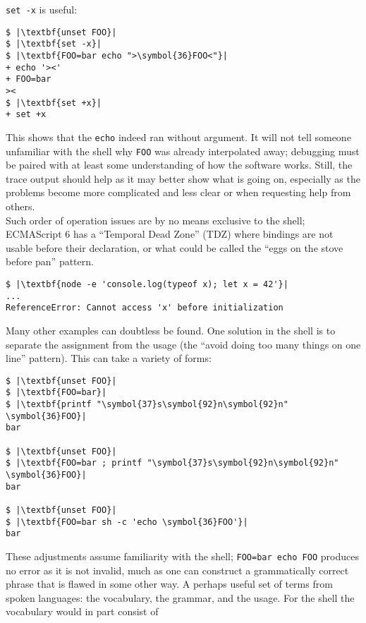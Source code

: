 \documentclass[10pt,a4paper]{article}
\begin{document}
\texttt{set -x} is useful:

\begin{lstlisting}
$ |\textbf{unset FOO}|
$ |\textbf{set -x}|
$ |\textbf{FOO=bar echo ">\symbol{36}FOO<"}|
+ echo '><'
+ FOO=bar
><
$ |\textbf{set +x}|
+ set +x
\end{lstlisting}

This shows that the \texttt{echo} indeed ran without argument. It will
not tell someone unfamiliar with the shell why \texttt{FOO}
was already interpolated away; debugging must be paired with at least
some understanding of how the software works. Still, the trace output
should help as it may better show what is going on, especially as the
problems become more complicated and less clear or when requesting help
from others. \\

Such order of operation issues are by no means exclusive to the shell;
ECMAScript 6 has a ``Temporal Dead Zone'' (TDZ) where bindings are not
usable before their declaration, or what could be called the ``eggs on
the stove before pan'' pattern.

\begin{lstlisting}
$ |\textbf{node -e 'console.log(typeof x); let x = 42'}|
...
ReferenceError: Cannot access 'x' before initialization
\end{lstlisting}

Many other examples can doubtless be found. One solution in the shell is
to separate the assignment from the usage (the ``avoid doing too many
things on one line'' pattern). This can take a variety of forms:

\begin{lstlisting}
$ |\textbf{unset FOO}|
$ |\textbf{FOO=bar}|
$ |\textbf{printf "\symbol{37}s\symbol{92}n\symbol{92}n" \symbol{36}FOO}|
bar

$ |\textbf{unset FOO}|
$ |\textbf{FOO=bar ; printf "\symbol{37}s\symbol{92}n\symbol{92}n" \symbol{36}FOO}|
bar

$ |\textbf{unset FOO}|
$ |\textbf{FOO=bar sh -c 'echo \symbol{36}FOO'}|
bar
\end{lstlisting}

These adjustments assume familiarity with the shell; \texttt{FOO=bar
echo FOO} produces no error as it is not invalid, much as one
can construct a grammatically correct phrase that is flawed in some
other way. A perhaps useful set of terms from spoken languages: the
vocabulary, the grammar, and the usage. For the shell the vocabulary
would in part consist of
\end{document}

